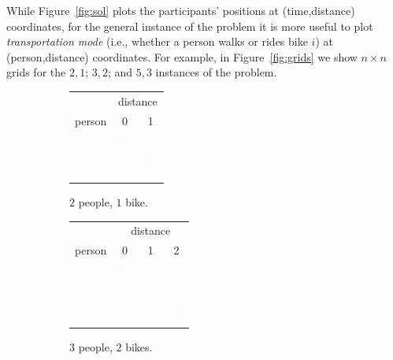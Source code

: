\documentclass[DIV=calc, paper=a4, fontsize=11pt, twocolumn]{scrartcl}	 %
\begin{document}
While Figure~\ref{fig:sol} plots the participants' positions at (time,distance) coordinates, for the general instance of the problem it is more useful to plot {\em transportation mode} (i.e., whether a person walks or rides bike $i$) at (person,distance) coordinates. For example, in Figure~\ref{fig:grids} we show $n \times n$ grids for the $2,1$; $3,2$; and $5,3$ instances of the problem.

\newcommand\BA{\cellcolor{WildStrawberry}~\textcolor{White}{$b_0$}}
\newcommand\BB{\cellcolor{NavyBlue}      ~\textcolor{White}{$b_1$}}
\newcommand\BC{\cellcolor{OliveGreen}   ~\textcolor{White}{$b_2$}}
\begin{figure}[t]
	\begin{subfigure}[b]{0.28\textwidth}
		\begin{tabular}{rp{1.5em}|p{1.5em}|}
		& \multicolumn{2}{c}{distance} \\
		person & \multicolumn{1}{|c|}{0} & \multicolumn{1}{c|}{1} \\
		\hline
		\multicolumn{1}{r|}{\PA} & \BA & \\
		\cline{2-3}
		\multicolumn{1}{r|}{\PB} & & \BA \\
		\cline{2-3}
		\multicolumn{3}{c}{}\\
		\multicolumn{3}{c}{}\\
		\multicolumn{3}{c}{}\\
		\end{tabular}
		\caption{$2$ people, $1$ bike.}
	\end{subfigure}
	\begin{subfigure}[b]{0.33\textwidth}
		\begin{tabular}{rp{1.5em}|p{1.5em}|p{1.5em}|}
		& \multicolumn{3}{c}{distance} \\
		person & \multicolumn{1}{|c|}{0} & \multicolumn{1}{c|}{1} & \multicolumn{1}{c|}{2} \\
		\hline
		\multicolumn{1}{r|}{\PA} & \BA & \BB & \\
		\cline{2-4}
		\multicolumn{1}{r|}{\PB} & & \BA & \BB \\
		\cline{2-4}
		\multicolumn{1}{r|}{\PC} & \BB & & \BA \\
		\cline{2-4}
		\multicolumn{4}{c}{}\\
		\multicolumn{4}{c}{}\\
		\end{tabular}
		\caption{$3$ people, $2$ bikes.}
	\end{subfigure}
	\begin{subfigure}[b]{0.38\textwidth}
		\begin{tabular}{rp{1.5em}|p{1.5em}|p{1.5em}|p{1.5em}|p{1.5em}|}

\end{tabular}
\end{subfigure}
\end{figure}
\end{document}
